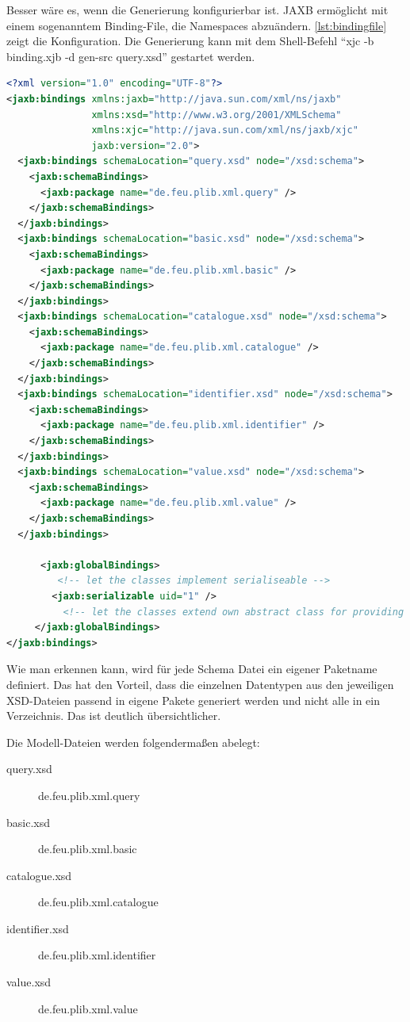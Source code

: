 Besser wäre es, wenn die Generierung konfigurierbar ist. \gls{JAXB} ermöglicht mit einem sogenanntem Binding-File, die Namespaces abzuändern. \autoref{lst:bindingfile} zeigt die Konfiguration. Die Generierung kann mit dem Shell-Befehl \enquote{xjc -b binding.xjb -d gen-src query.xsd} gestartet werden.  

\begin{lstlisting}[caption=Binding File binding.xjc, language=XML, label=lst:bindingfile]
<?xml version="1.0" encoding="UTF-8"?>
<jaxb:bindings xmlns:jaxb="http://java.sun.com/xml/ns/jaxb"
               xmlns:xsd="http://www.w3.org/2001/XMLSchema"
               xmlns:xjc="http://java.sun.com/xml/ns/jaxb/xjc"
               jaxb:version="2.0">
  <jaxb:bindings schemaLocation="query.xsd" node="/xsd:schema">
    <jaxb:schemaBindings>
      <jaxb:package name="de.feu.plib.xml.query" />
    </jaxb:schemaBindings>
  </jaxb:bindings>
  <jaxb:bindings schemaLocation="basic.xsd" node="/xsd:schema">
    <jaxb:schemaBindings>
      <jaxb:package name="de.feu.plib.xml.basic" />
    </jaxb:schemaBindings>
  </jaxb:bindings>
  <jaxb:bindings schemaLocation="catalogue.xsd" node="/xsd:schema">
    <jaxb:schemaBindings>
      <jaxb:package name="de.feu.plib.xml.catalogue" />
    </jaxb:schemaBindings>
  </jaxb:bindings>
  <jaxb:bindings schemaLocation="identifier.xsd" node="/xsd:schema">
    <jaxb:schemaBindings>
      <jaxb:package name="de.feu.plib.xml.identifier" />
    </jaxb:schemaBindings>
  </jaxb:bindings>
  <jaxb:bindings schemaLocation="value.xsd" node="/xsd:schema">
    <jaxb:schemaBindings>
      <jaxb:package name="de.feu.plib.xml.value" />
    </jaxb:schemaBindings>
  </jaxb:bindings> 
  
      <jaxb:globalBindings>
         <!-- let the classes implement serialiseable -->
        <jaxb:serializable uid="1" />
          <!-- let the classes extend own abstract class for providing some extra functionality for each one -->
     </jaxb:globalBindings>  
</jaxb:bindings> 
\end{lstlisting}

Wie man erkennen kann, wird für jede Schema Datei ein eigener Paketname definiert. Das hat den Vorteil, dass die einzelnen Datentypen aus den jeweiligen XSD-Dateien passend in eigene Pakete generiert werden und nicht alle in ein Verzeichnis. Das ist deutlich übersichtlicher. 

Die Modell-Dateien werden folgendermaßen abelegt:

\begin{description}
\item[query.xsd] de.feu.plib.xml.query
\item[basic.xsd] de.feu.plib.xml.basic
\item[catalogue.xsd] de.feu.plib.xml.catalogue
\item[identifier.xsd] de.feu.plib.xml.identifier
\item[value.xsd] de.feu.plib.xml.value
\end{description}

